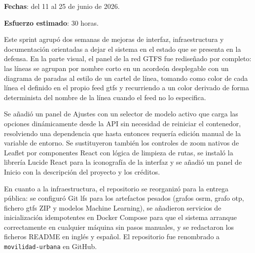 \textbf{Fechas}: del 11 al 25 de junio de 2026.

\textbf{Esfuerzo estimado}: 30 horas.\newline

Este sprint agrupó dos semanas de mejoras de interfaz, infraestructura y documentación orientadas a dejar el sistema en el estado que se presenta en la defensa. En la parte visual, el panel de la red GTFS fue rediseñado por completo: las líneas se agrupan por nombre corto en un acordeón desplegable con un diagrama de paradas al estilo de un cartel de línea, tomando como color de cada línea el definido en el propio feed \gls{gtfs} y recurriendo a un color derivado de forma determinista del nombre de la línea cuando el feed no lo especifica.

\newpage

Se añadió un panel de Ajustes con un selector de modelo activo que carga las opciones dinámicamente desde la API sin necesidad de reiniciar el contenedor, resolviendo una dependencia que hasta entonces requería edición manual de la variable de entorno. Se sustituyeron también los controles de zoom nativos de Leaflet por componentes React con lógica de limpieza de rutas, se instaló la librería Lucide React para la iconografía de la interfaz y se añadió un panel de Inicio con la descripción del proyecto y los créditos.\newline

En cuanto a la infraestructura, el repositorio se reorganizó para la entrega pública: se configuró Git \acrshort{lfs} para los artefactos pesados (grafos \gls{osrm}, grafo \gls{otp}, fichero \gls{gtfs} ZIP y modelos Machine Learning), se añadieron servicios de inicialización idempotentes en Docker Compose para que el sistema arranque correctamente en cualquier máquina sin pasos manuales, y se redactaron los ficheros README en inglés y español. El repositorio fue renombrado a \texttt{movilidad-urbana} en GitHub.\newline

